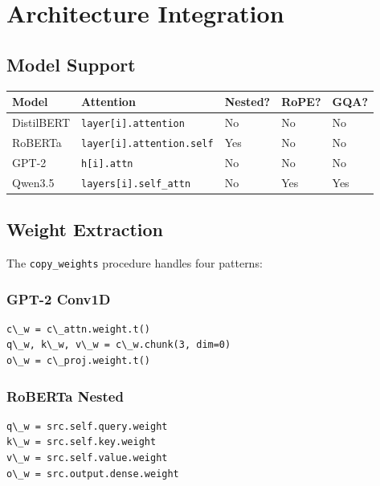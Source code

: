 \section{Architecture Integration}

\subsection{Model Support}

\begin{table}[H]
\centering
\small
\begin{tabular}{lllll}
\toprule
\textbf{Model} & \textbf{Attention} & \textbf{Nested?} & \textbf{RoPE?} & \textbf{GQA?} \\
\midrule
DistilBERT & \texttt{layer[i].attention} & No & No & No \\
RoBERTa & \texttt{layer[i].attention.self} & Yes & No & No \\
GPT-2 & \texttt{h[i].attn} & No & No & No \\
Qwen3.5 & \texttt{layers[i].self\_attn} & No & Yes & Yes \\
\bottomrule
\end{tabular}
\end{table}

\subsection{Weight Extraction}

The \texttt{copy\_weights} procedure handles four patterns:

\subsubsection{GPT-2 Conv1D}

\begin{lstlisting}
c\_w = c\_attn.weight.t()
q\_w, k\_w, v\_w = c\_w.chunk(3, dim=0)
o\_w = c\_proj.weight.t()
\end{lstlisting}

\subsubsection{RoBERTa Nested}

\begin{lstlisting}
q\_w = src.self.query.weight
k\_w = src.self.key.weight
v\_w = src.self.value.weight
o\_w = src.output.dense.weight
\end{lstlisting}

